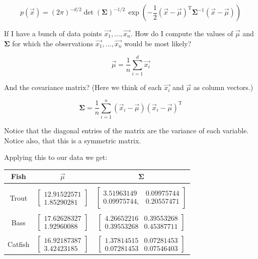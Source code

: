 $$p(\vec{x}) = (2\pi)^{-d/2}\det (\boldsymbol\Sigma)^{-1/2} \, \exp \left( -\frac{1}{2} (\vec{x} - \vec\mu)^\mathrm{T} \boldsymbol\Sigma^{-1}(\vec{x} - \vec\mu) \right)$$

If I have a bunch of data points $\vec{x_1}, ..., \vec{x_n}$.   How do I compute the values of $\vec{\mu}$ and $\boldsymbol\Sigma$ for which the observations $\vec{x_1}, ..., \vec{x_n}$ would be most likely?

$$\vec{\mu} = \frac{1}{n} \sum_{i = 1}^{d} \vec{x_i}$$

And the covariance matrix?  (Here we think of each $\vec{x_i}$  and $\vec{\mu}$ as  column vectors.)

$$\boldsymbol\Sigma = \frac{1}{n}\sum_{i=1}^n (\vec{x}_i-\vec{\mu})(\vec{x}_i-\vec{\mu})^\mathrm{T}$$

Notice that the diagonal entries of the matrix are the variance of each variable.  Notice also, that this is a symmetric matrix.

Applying this to our data we get:


\begin{tabular}{c | c | c}
Fish & $\vec{\mu}$  &$\boldsymbol\Sigma$ \\
\hline   & &\\
Trout & $\begin{bmatrix}
 12.91522571\\1.85290281
 \end{bmatrix}$ & 
$\begin{bmatrix}
3.51963149 & 0.09975744 \\
 0.09975744, & 0.20557471
 \end{bmatrix}$ \\ & & \\
Bass  & $\begin{bmatrix}
  17.62628327 \\ 1.92960088
 \end{bmatrix}$ & 
$\begin{bmatrix}
4.26652216 & 0.39553268 \\
0.39553268 & 0.45387711
 \end{bmatrix}$\\ & & \\
 
 Catfish  & $\begin{bmatrix}16.92187387 \\ 3.42423185
 \end{bmatrix}$ & 
$\begin{bmatrix}
1.37814515 &0.07281453 \\
0.07281453 & 0.07546403
 \end{bmatrix}$\\
\end{tabular}

